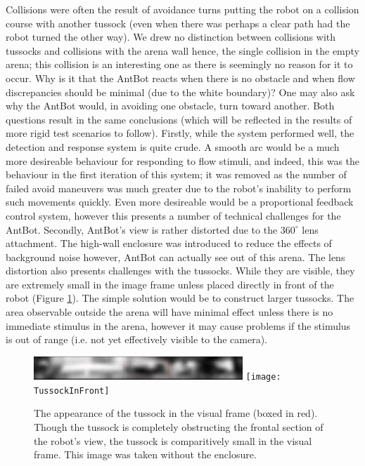 \documentclass[a4paper,11pt,twoside,openright]{article}
\begin{document}
Collisions were often the result of avoidance turns putting the robot on a collision course with another tussock (even when there was perhaps
a clear path had the robot turned the other way). We drew no distinction between collisions with tussocks and collisions with the arena wall
hence, the single collision in the empty arena; this collision is an interesting one as there is seemingly no reason for it to occur. Why
is it that the AntBot reacts when there is no obstacle and when flow discrepancies should be minimal (due to the white boundary)? One may also
ask why the AntBot would, in avoiding one obstacle, turn toward another. Both questions result in the same conclusions (which will be reflected
in the results of more rigid test scenarios to follow). Firstly, while the system performed well, the detection and response system is quite crude.
A smooth arc would be a much more desireable behaviour for responding to flow stimuli, and indeed, this was the behaviour in the first iteration of
this system; it was removed as the number of failed avoid maneuvers was much greater due to the robot's inability to perform such movements quickly.
Even more desireable would be a proportional feedback control system, however this presents a number of technical challenges for the AntBot. Secondly,
AntBot's view is rather distorted due to the $360^{\circ}$ lens attachment. The high-wall enclosure was introduced to reduce the effects of background noise
however, AntBot can actually see out of this arena. The lens distortion also presents challenges with the tussocks. While they are visible, they are
extremely small in the image frame unless placed directly in front of the robot (Figure \ref{fig:distortion}). The simple
solution would be to construct larger tussocks. The area observable outside the arena will have minimal effect unless there is no immediate stimulus
in the arena, however it may cause problems if the stimulus is out of range (i.e. not yet effectively visible to the camera).

\begin{figure}
  \centering
  \includegraphics[width=0.7\textwidth]{TussockInFrame}
  \texttt{[image: TussockInFront]}
  \caption{
    \label{fig:distortion} The appearance of the tussock in the visual frame (boxed in red). Though the tussock is completely obstructing the frontal
    section of the robot's view, the tussock is comparitively small in the visual frame. This image was taken without the enclosure.
  }
\end{figure}
\end{document}
